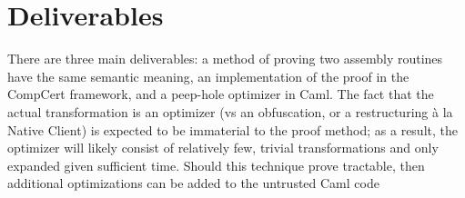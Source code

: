 \documentclass{exam}
\begin{document}
\section{Deliverables}
There are three main deliverables: a method of proving two assembly
routines have the same semantic meaning, an implementation of the
proof in the CompCert framework, and a peep-hole optimizer in Caml.
The fact that the actual transformation is an optimizer (vs an
obfuscation, or a restructuring \`a la Native Client) is expected to
be immaterial to the proof method; as a result, the optimizer will
likely consist of relatively few, trivial transformations and only
expanded given sufficient time. Should this technique prove tractable,
then additional optimizations can be added to the untrusted Caml code
\end{document}
